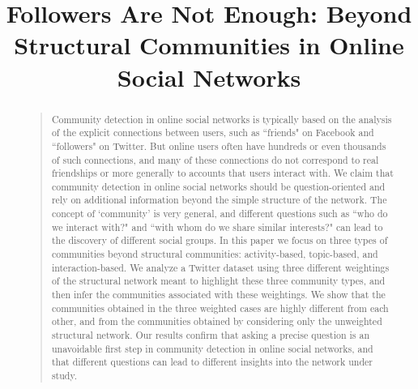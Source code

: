 \documentclass[letterpaper]{article}
\begin{document}
\title{
Followers Are Not Enough: Beyond Structural Communities in Online Social Networks%
 }
 

\maketitle

\begin{abstract}
\begin{quote}
Community detection in online social networks is typically based on the analysis of the explicit connections between users, such as ``friends" on Facebook and ``followers" on Twitter. But online users often have hundreds or even thousands of such connections, and many of these connections do not correspond to real friendships or more generally to accounts that users interact with. We claim that community detection in online social networks should be question-oriented and rely on additional information beyond the simple structure of the network. The concept of `community' is very general, and different questions such as ``who do we interact with?" and ``with whom do we share similar interests?" can lead to the discovery of different social groups. In this paper we focus on three types of communities beyond structural communities: activity-based, topic-based, and interaction-based. We analyze a Twitter dataset using three different weightings of the structural network meant to highlight these three community types, and then infer the communities associated with these weightings. We show that the communities obtained in the three weighted cases are highly different from each other, and from the communities obtained by considering only the unweighted structural network. Our results confirm that asking a precise question is an unavoidable first step in community detection in online social networks, and that different questions can lead to different insights into the network under study.
\end{quote}
\end{abstract}









\end{document}
